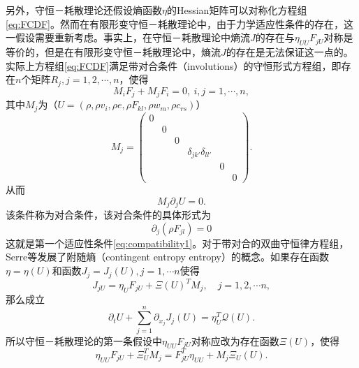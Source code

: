 
另外，守恒－耗散理论还假设熵函数$\eta$的Hessian矩阵可以对称化方程组\eqref{eq:FCDF}。然而在有限形变守恒－耗散理论中，由于力学适应性条件的存在，这一假设需要重新考虑。事实上，在守恒－耗散理论中熵流$J$的存在与$\eta_{UU}F_{jU}$对称是等价的，但是在有限形变守恒－耗散理论中，熵流$J$的存在是无法保证这一点的。实际上方程组\eqref{eq:FCDF}满足带对合条件（involutions）的守恒形式方程组\cite{dafermos1986quasilinear,dafermos2013non,benzoni2007multi}，即存在$n$个矩阵$R_j,j=1,2,\cdots,n$，使得
\begin{equation*}
	M_i F_{j} + M_j F_i = 0, \ i,j = 1, \cdots,n ,
\end{equation*}
其中$M_j$为（$U= (\rho,\rho v_i,\rho e, \rho F_{kl},\rho w_m, \rho c_{rs})$）
\begin{equation*}
	M_{j} = \left( \begin{array}{ccccccc}
		0 \\
		& 0 \\
		& & 0 \\
		& & & \delta_{jk'}\delta_{ll'} \\
		& & & & 0 \\
		& & & & & 0
	\end{array} \right).
\end{equation*}
从而
\begin{equation}\label{eq:involutions}
	M_j \partial_j U = 0.
\end{equation}
该条件称为对合条件，该对合条件的具体形式为
\begin{equation*}
	\partial_{j} (\rho F_{jl}) = 0
\end{equation*}
这就是第一个适应性条件\eqref{eq:compatibility1}。对于带对合的双曲守恒律方程组，Serre等发展了附随熵（contingent entropy entropy）的概念。如果存在函数$\eta = \eta(U)$和函数$J_j=J_j(U),j=1, \cdots n$使得
\begin{equation*}
	J_{jU}  = \eta_U F_{jU} + \Xi(U)^T M_j,\quad j=1,2, \cdots n,
\end{equation*}
那么成立
\begin{equation*}
	\partial_t U + \sum_{j=1}^n \partial_{x_j} J_{j}(U) = \eta_U^T \mathcal{Q}(U).
\end{equation*}
所以守恒－耗散理论的第一条假设中$\eta_{UU} F_{jU}$对称应改为存在函数$\Xi(U)$，使得
\begin{equation}\label{eq:invsym}
	\eta_{UU} F_{jU} + \Xi_U^T M_j = F_{jU}^T \eta_{UU} + M_j \Xi_U(U).
\end{equation}

